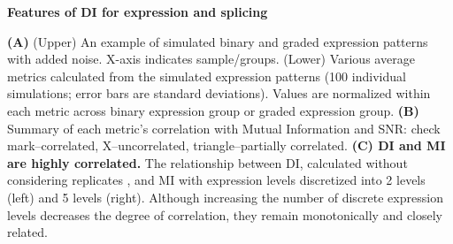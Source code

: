 \textbf{Features of DI for expression and splicing}

\textbf{(A)} (Upper) An example of simulated binary and graded expression patterns with added noise. X-axis indicates sample/groups. (Lower) Various average metrics calculated from the simulated expression patterns (100 individual simulations; error bars are standard deviations). Values are normalized within each metric across binary expression group or graded expression group. 
\textbf{(B)} Summary of each metric's correlation with Mutual Information and SNR: check mark--correlated, X--uncorrelated, triangle--partially correlated.
\textbf{(C) DI and MI are highly correlated.} The relationship between DI, calculated without considering replicates%
, and MI with expression levels discretized into 2 levels (left) and 5 levels (right). Although increasing the number of discrete expression levels decreases the degree of correlation, they remain monotonically and closely related.

